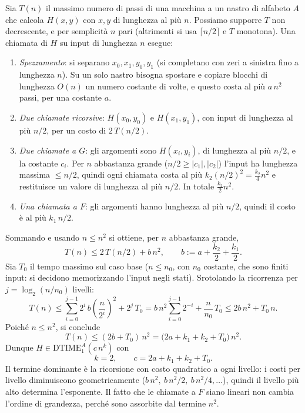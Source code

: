 \begin{sol}
Sia $T(n)$ il massimo numero di passi di una macchina a un nastro di alfabeto $A$ che calcola $H(x,y)$
con $x,y$ di lunghezza al più $n$. Possiamo supporre $T$ non decrescente, e per semplicità $n$ pari
(altrimenti si usa $\lceil n/2\rceil$ e $T$ monotona). Una chiamata di $H$ su input di lunghezza $n$ esegue:
\begin{enumerate}
  \item \emph{Spezzamento}: si separano $x_0,x_1,y_0,y_1$ (si completano con zeri a sinistra fino a lunghezza $n$).
  Su un solo nastro bisogna spostare e copiare blocchi di lunghezza $O(n)$ un numero costante di volte,
  e questo costa al più $a\,n^2$ passi, per una costante $a$.
  \item \emph{Due chiamate ricorsive}: $H(x_0,y_0)$ e $H(x_1,y_1)$, con input di lunghezza al più $n/2$,
  per un costo di $2\,T(n/2)$.
  \item \emph{Due chiamate a $G$}: gli argomenti sono $H(x_i,y_i)$, di lunghezza al più $n/2$, e la costante $c_i$.
  Per $n$ abbastanza grande ($n/2\geq |c_1|,|c_2|$) l'input ha lunghezza massima $\leq n/2$, quindi
  ogni chiamata costa al più $k_2 (n/2)^2=\tfrac{k_2}{4}n^2$ e restituisce un valore di lunghezza al più $n/2$.
  In totale $\tfrac{k_2}{2}n^2$.
  \item \emph{Una chiamata a $F$}: gli argomenti hanno lunghezza al più $n/2$, quindi il costo è al più $k_1\,n/2$.
\end{enumerate}
Sommando e usando $n\leq n^2$ si ottiene, per $n$ abbastanza grande,
\[
T(n)\leq 2\,T(n/2)+b\,n^2,\qquad b:=a+\frac{k_2}{2}+\frac{k_1}{2}.
\]
Sia $T_0$ il tempo massimo sul caso base ($n\leq n_0$, con $n_0$ costante, che sono finiti input: si
decidono memorizzando l'input negli stati). Srotolando la ricorrenza per $j=\log_2(n/n_0)$ livelli:
\[
T(n)\leq \sum_{i=0}^{j-1}2^i\,b\left(\frac{n}{2^i}\right)^2+2^j\,T_0
= b\,n^2\sum_{i=0}^{j-1}2^{-i}+\frac{n}{n_0}\,T_0
\leq 2b\,n^2+T_0\,n .
\]
Poiché $n\leq n^2$, si conclude
\[
T(n)\leq (2b+T_0)\,n^2=\big(2a+k_1+k_2+T_0\big)\,n^2 .
\]
Dunque $H\in\mathrm{DTIME}^A_1(c\,n^k)$ con
\[
k=2,\qquad c=2a+k_1+k_2+T_0 .
\]
Il termine dominante è la ricorsione con costo quadratico a ogni livello: i costi per livello
diminuiscono geometricamente ($b\,n^2,\ b\,n^2/2,\ b\,n^2/4,\dots$), quindi il livello più alto determina l'esponente.
Il fatto che le chiamate a $F$ siano lineari non cambia l'ordine di grandezza, perché sono assorbite dal termine $n^2$.
\end{sol}